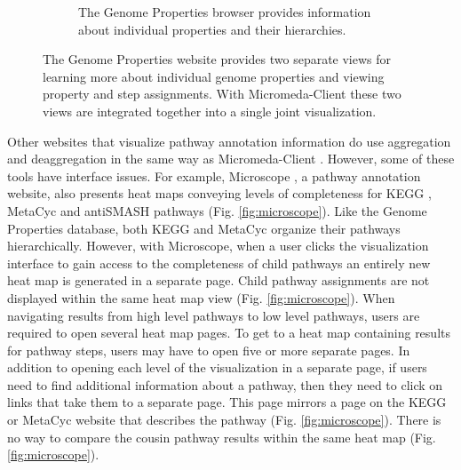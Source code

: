 \begin{figure}
\begin{subfigure}[b]{0.46\textwidth}
         \caption{The Genome Properties browser provides information about individual properties and their hierarchies.}
         \label{fig:property-browser}
     \end{subfigure}
     \caption{The Genome Properties website provides two separate views for learning more about individual genome properties and viewing property and step assignments. With Micromeda-Client these two views are integrated together into a single joint visualization.}
     \label{fig:genome-properties-interface}
\end{figure}

Other websites that visualize pathway annotation information do use aggregation and deaggregation in the same way as Micromeda-Client \cite{vallenet2016microscope,darzi2019functree2}. However, some of these tools have interface issues. For example, Microscope \cite{vallenet2016microscope}, a pathway annotation website, also presents heat maps conveying levels of completeness for KEGG \cite{kanehisa2000kegg}, MetaCyc \cite{karp2002metacyc} and antiSMASH \cite{blin2019antismash} pathways (Fig. \ref{fig:microscope}). Like the Genome Properties database, both KEGG and MetaCyc organize their pathways hierarchically. However, with Microscope, when a user clicks the visualization interface to gain access to the completeness of child pathways an entirely new heat map is generated in a separate page. Child pathway assignments are not displayed within the same heat map view (Fig. \ref{fig:microscope}). When navigating results from high level pathways to low level pathways, users are required to open several heat map pages. To get to a heat map containing results for pathway steps, users may have to open five or more separate pages. In addition to opening each level of the visualization in a separate page, if users need to find additional information about a pathway, then they need to click on links that take them to a separate page. This page mirrors a page on the KEGG or MetaCyc website that describes the pathway (Fig. \ref{fig:microscope}). There is no way to compare the cousin pathway results within the same heat map (Fig. \ref{fig:microscope}).

